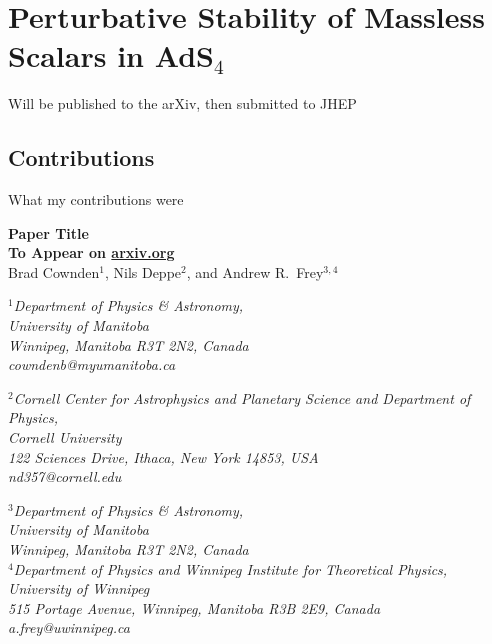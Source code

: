 \documentclass[../PhD.tex]{subfiles}
\begin{document}

\chapter{Perturbative Stability of Massless Scalars in AdS$_4$}

Will be published to the arXiv, then submitted to JHEP


\section{Contributions}

What my contributions were

\newpage


\begin{center}
{\bf{\Large Paper Title}} \\
\bigskip
{\bf To Appear on \href{https://arxiv.org}{arxiv.org}} \\
\bigskip
\bigskip
Brad Cownden$^1$, Nils Deppe$^2$, and Andrew R.~Frey$^{3,4}$\\
\bigskip

$^1${\it Department of Physics \& Astronomy,\\ University of Manitoba\\
Winnipeg, Manitoba R3T 2N2, Canada \\ {\rm cowndenb@myumanitoba.ca}} \\
\vspace{0.1in}

$^2${\it Cornell Center for Astrophysics and Planetary Science and
Department of Physics,\\ Cornell University\\
122 Sciences Drive, Ithaca, New York 14853, USA \\ {\rm nd357@cornell.edu}} \\
\vspace{0.1in}

$^3${\it Department of Physics \& Astronomy,\\ University of Manitoba\\
Winnipeg, Manitoba R3T 2N2, Canada} \\
$^4${\it Department of Physics and Winnipeg Institute for Theoretical
Physics,\\ University of Winnipeg\\
515 Portage Avenue, Winnipeg, Manitoba R3B 2E9, Canada \\ {\rm a.frey@uwinnipeg.ca}}
\end{center}
\end{document}

